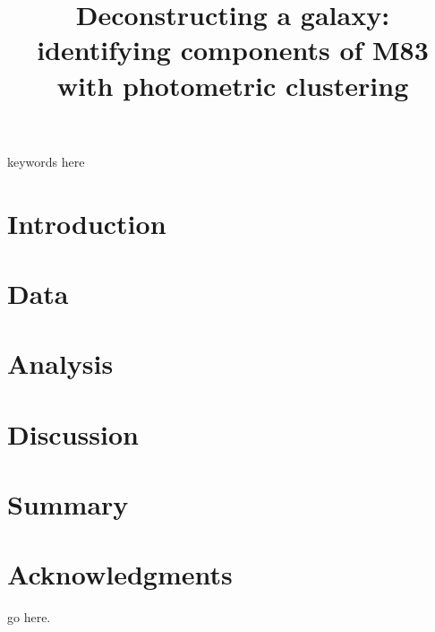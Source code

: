 \documentclass[useAMS,usenatbib]{mn2e}
\title[Deconstructing M83]{Deconstructing a galaxy: identifying components of M83 with photometric clustering}
\author[Barmby \& Kiar]
\begin{document}
\date{}


\maketitle

\label{firstpage}

\begin{abstract}

\end{abstract}

\begin{keywords}
keywords here
\end{keywords}

\section{Introduction}


\section{Data}


\section{Analysis}


\section{Discussion}


\section{Summary}



\section*{Acknowledgments}

go here.


{}

\bsp



\appendix

\label{lastpage}
\end{document}
